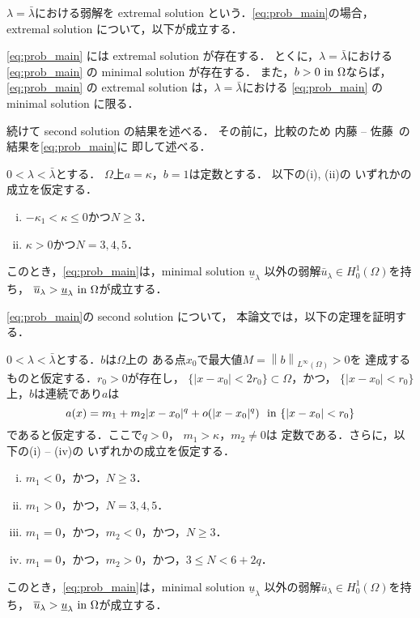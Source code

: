 $\lambda = \bar{\lambda}$における弱解を
extremal solution という．\ref{eq:prob_main}の場合，
extremal solution について，以下が成立する．

\begin{thm} \label{thm:extremal_solution}
 \ref{eq:prob_main} には extremal solution が存在する．
 とくに，$\lambda = \bar{\lambda}$における
 \ref{eq:prob_main} の
 minimal solution が存在する．
 また，$b > 0 ~\text{in}~ \Omega$ならば，\ref{eq:prob_main} の 
 extremal solution は，$\lambda = \bar{\lambda}$における
 \ref{eq:prob_main} の
 minimal solution に限る．
\end{thm}

続けて second solution の結果を述べる．
その前に，比較のため
内藤 -- 佐藤~\cite{MR2886160}の結果を\ref{eq:prob_main}に
即して述べる．

\begin{thm}
 \label{thm:second_solution_naito_sato}
 $0 < \lambda < \bar{\lambda}$とする．
 $\Omega$上$a = \kappa$，$b = 1$は定数とする．
 以下の(i), (ii)の
 いずれかの成立を仮定する．
 \begin{enumerate}[(i)]
  \item $-\kappa_1 < \kappa \leq 0$かつ$N \geq 3$．
  \item $\kappa > 0$かつ$N = 3, 4, 5$．
 \end{enumerate}
 このとき，\ref{eq:prob_main}は，minimal solution
 $\underline{u}_\lambda$
 以外の弱解$\bar{u}_\lambda \in H_0^1(\Omega)$を持ち，
 $\overline{u}_\lambda >
 \underline{u}_\lambda ~\text{in}~ \Omega$が成立する．
\end{thm}

\ref{eq:prob_main}の second solution について，
本論文では，以下の定理を証明する．

\begin{thm} \label{thm:second_solution}
 $0 < \lambda < \bar{\lambda}$とする．$b$は$\Omega$上の
 ある点$x_0$で最大値$M = \left\| b \right\|_{L^\infty(\Omega)} > 0$を
 達成するものと仮定する．$r_0 > 0$が存在し，
 $\{ \lvert x - x_0 \rvert < 2r_0 \} \subset \Omega$，かつ，
 $\{ \lvert x - x_0 \rvert < r_0 \}$上，$b$は連続であり$a$は
 \begin{equation}
  a(x) = m_1 + m_2 \lvert x-x_0 \rvert^{q} 
  + o(\lvert x-x_0 \rvert^{q}) \ \ \text{in}~ \{ \lvert x - x_0 \rvert < r_0
  \} \label{eq:a_q}
 \end{equation}
 であると仮定する．ここで$q > 0$，
 $m_1 > \kappa$，$m_2 \neq 0$は
 定数である．さらに，以下の(i) -- (iv)の
 いずれかの成立を仮定する．
 \begin{enumerate}[(i)]
  \item $m_1 < 0$，かつ，$N \geq 3$．
  \item $m_1 > 0$，かつ，$N = 3, 4, 5$．
  \item $m_1 = 0$，かつ，$m_2 < 0$，かつ，$N \geq 3$．
  \item $m_1 = 0$，かつ，$m_2 > 0$，かつ，$3 \leq N < 6 + 2q$．
 \end{enumerate}
 このとき，\ref{eq:prob_main}は，minimal solution
 $\underline{u}_\lambda$
 以外の弱解$\bar{u}_\lambda \in H_0^1(\Omega)$を持ち，
 $\overline{u}_\lambda >
 \underline{u}_\lambda ~\text{in}~ \Omega$が成立する．
\end{thm}

